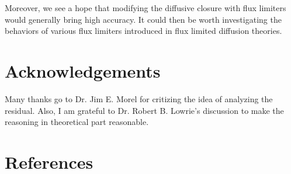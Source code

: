 \documentclass[review]{elsarticle}
\begin{document}
Moreover, we see a hope that modifying the diffusive closure with flux limiters would generally bring high accuracy. It could then be worth investigating the behaviors of various flux limiters introduced in flux limited diffusion theories.

\section*{Acknowledgements}
Many thanks go to Dr. Jim E. Morel for critizing the idea of analyzing the residual. Also, I am grateful to Dr. Robert B. Lowrie's discussion to make the reasoning in theoretical part reasonable.


\section*{References}

\end{document}
